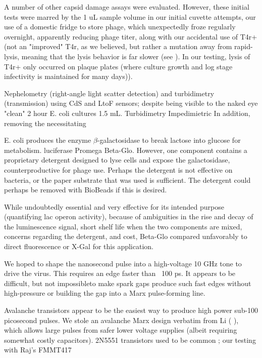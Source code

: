\documentclass[paper.tex]{subfiles}
\begin{document}
\begin{multicols}{1}
A number of other capsid damage assays were evaluated. However, these initial tests were marred by the 1 uL sample volume in our initial cuvette attempts, our use of a domestic fridge to store phage, which unexpectedly froze regularly overnight, apparently reducing phage titer, along with our accidental use of T4r+ (not an "improved" T4r, as we believed, but rather a mutation away from rapid-lysis, meaning that the lysis behavior is far slower (see \cite{Spontaneous1946}). In our testing, lysis of T4r+ only occurred on plaque plates (where culture growth and log stage infectivity is maintained for many days)). 

Nephelometry (right-angle light scatter detection) and turbidimetry (transmission) using CdS and LtoF sensors; despite being visible to the naked eye "clean" 2 hour E. coli cultures 1.5 mL. Turbidimetry\cite{Fast2019} Impedimietric In addition, removing the necessitating 

E. coli produces the enzyme $\beta$-galactosidase to break lactose into glucose for metabolism. luciferase Promega Beta-Glo\cite{rapid2014}. However, one component contains a proprietary detergent designed to lyse cells and expose the galactosidase, counterproductive for phage use. Perhaps the detergent is not effective on bacteria, or the paper substrate that was used is sufficient. The detergent could perhaps be removed with BioBeads if this is desired.
 
While undoubtedly essential and very effective for its intended purpose (quantifying lac operon activity), because of ambiguities in the rise and decay of the luminescence signal, short shelf life when the two components are mixed, concerns regarding the detergent, and cost, Beta-Glo compared unfavorably to direct fluorescence or X-Gal for this application.



We hoped to shape the nanosecond pulse into a high-voltage 10 GHz tone to drive the virus. This requires an edge faster than ~100 ps. It appears to be difficult, but not impossible\cite{Fundamental1998}to make spark gaps produce such fast edges without high-pressure\cite{kHz1995} \cite{Design2007d}\cite{Picosecond1993} or building the gap into a Marx\cite{Simple1991} pulse-forming line. 

Avalanche transistors appear to be the easiest way to produce high power sub-100 picosecond pulses. We stole an avalanche Marx design verbatim from Li (\cite{Development2016b} \cite{Design2018c}), which allows large pulses from safer lower voltage supplies (albeit requiring somewhat costly capacitors). 2N5551 transistors used to be common \cite{Avalanche1991}\cite{high1994}\cite{High1998}; our testing with Raj's FMMT417


\end{multicols}
\end{document}

